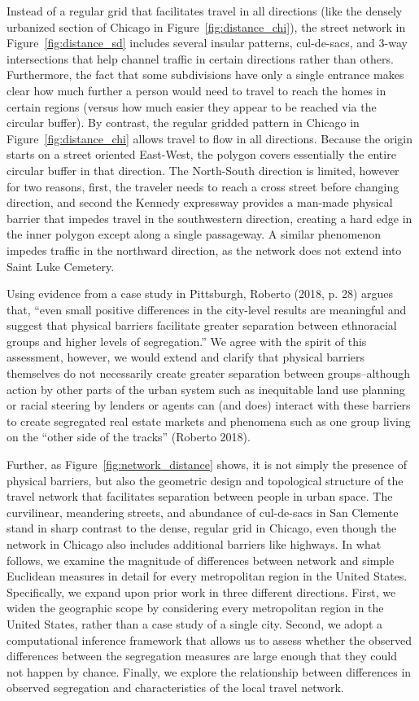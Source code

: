 \documentclass[
  10pt,
]{article}
\begin{document}
Instead of a regular grid that facilitates travel in all directions
(like the densely urbanized section of Chicago in
Figure~\ref{fig:distance_chi}), the street network in
Figure~\ref{fig:distance_sd} includes several insular patterns,
cul-de-sacs, and 3-way intersections that help channel traffic in
certain directions rather than others. Furthermore, the fact that some
subdivisions have only a single entrance makes clear how much further a
person would need to travel to reach the homes in certain regions
(versus how much easier they appear to be reached via the circular
buffer). By contrast, the regular gridded pattern in Chicago in
Figure~\ref{fig:distance_chi} allows travel to flow in all directions.
Because the origin starts on a street oriented East-West, the polygon
covers essentially the entire circular buffer in that direction. The
North-South direction is limited, however for two reasons, first, the
traveler needs to reach a cross street before changing direction, and
second the Kennedy expressway provides a man-made physical barrier that
impedes travel in the southwestern direction, creating a hard edge in
the inner polygon except along a single passageway. A similar phenomenon
impedes traffic in the northward direction, as the network does not
extend into Saint Luke Cemetery.

Using evidence from a case study in Pittsburgh, Roberto (2018, p. 28)
argues that, ``even small positive differences in the city-level results
are meaningful and suggest that physical barriers facilitate greater
separation between ethnoracial groups and higher levels of
segregation.'' We agree with the spirit of this assessment, however, we
would extend and clarify that physical barriers themselves do not
necessarily create greater separation between groups--although action by
other parts of the urban system such as inequitable land use planning or
racial steering by lenders or agents can (and does) interact with these
barriers to create segregated real estate markets and phenomena such as
one group living on the ``other side of the tracks'' (Roberto 2018).

Further, as Figure~\ref{fig:network_distance} shows, it is not simply
the presence of physical barriers, but also the geometric design and
topological structure of the travel network that facilitates separation
between people in urban space. The curvilinear, meandering streets, and
abundance of cul-de-sacs in San Clemente stand in sharp contrast to the
dense, regular grid in Chicago, even though the network in Chicago also
includes additional barriers like highways. In what follows, we examine
the magnitude of differences between network and simple Euclidean
measures in detail for every metropolitan region in the United States.
Specifically, we expand upon prior work in three different directions.
First, we widen the geographic scope by considering every metropolitan
region in the United States, rather than a case study of a single city.
Second, we adopt a computational inference framework that allows us to
assess whether the observed differences between the segregation measures
are large enough that they could not happen by chance. Finally, we
explore the relationship between differences in observed segregation and
characteristics of the local travel network.
\end{document}
